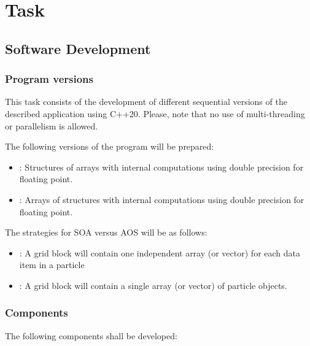 \section{Task}

\subsection{Software Development}

\subsubsection{Program versions}
\label{sec:tasks:versions}

This task consists of the development of different sequential versions
of the described application using C++20. Please, note that no use of
multi-threading or parallelism is allowed.

The following versions of the program will be prepared:
\begin{itemize}
\item {}: Structures of arrays with internal computations
using double precision for floating point.
\item {}: Arrays of structures with internal computations
using double precision for floating point.
\end{itemize}

The strategies for SOA versus AOS will be as follows:

\begin{itemize}
  \item {}:
        A grid block will contain one independent array (or vector) for
        each data item in a particle
  \item {}:
        A grid block will contain a single array (or vector) of particle objects.
\end{itemize}

\subsubsection{Components}

The following components shall be developed:

